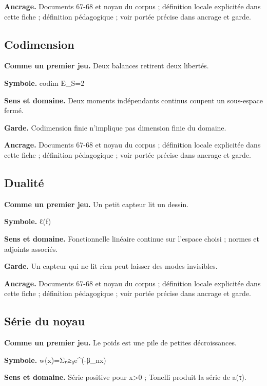 \documentclass[
  9pt,
  a4paper,
]{article}
\begin{document}
\textbf{Ancrage.} Documents 67-68 et noyau du corpus ; définition locale
explicitée dans cette fiche ; définition pédagogique ; voir portée
précise dans ancrage et garde.

\hypertarget{codimension}{%
\subsection{Codimension}\label{codimension}}

\textbf{Comme un premier jeu.} Deux balances retirent deux libertés.

\textbf{Symbole.} codim E\_S=2

\textbf{Sens et domaine.} Deux moments indépendants continus coupent un
sous-espace fermé.

\textbf{Garde.} Codimension finie n'implique pas dimension finie du
domaine.

\textbf{Ancrage.} Documents 67-68 et noyau du corpus ; définition locale
explicitée dans cette fiche ; définition pédagogique ; voir portée
précise dans ancrage et garde.

\hypertarget{dualituxe9}{%
\subsection{Dualité}\label{dualituxe9}}

\textbf{Comme un premier jeu.} Un petit capteur lit un dessin.

\textbf{Symbole.} ℓ(f)

\textbf{Sens et domaine.} Fonctionnelle linéaire continue sur l'espace
choisi ; normes et adjoints associés.

\textbf{Garde.} Un capteur qui ne lit rien peut laisser des modes
invisibles.

\textbf{Ancrage.} Documents 67-68 et noyau du corpus ; définition locale
explicitée dans cette fiche ; définition pédagogique ; voir portée
précise dans ancrage et garde.

\hypertarget{suxe9rie-du-noyau}{%
\subsection{Série du noyau}\label{suxe9rie-du-noyau}}

\textbf{Comme un premier jeu.} Le poids est une pile de petites
décroissances.

\textbf{Symbole.} w(x)=Σₙ≥₀e\^{}(-β\_nx)

\textbf{Sens et domaine.} Série positive pour x\textgreater0 ; Tonelli
produit la série de a(τ).
\end{document}
